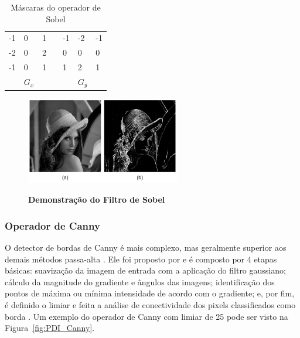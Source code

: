 \documentclass[12pt,oneside,a4paper,english,french,spanish,brazil,]{abntex2}
\begin{document}
\begin{table}[]
\centering
\caption{Máscaras do operador de Sobel}
\label{tab:Sobel}
\begin{tabular}{lllllll}
\cline{1-3} \cline{5-7}
\multicolumn{1}{|l|}{-1} & \multicolumn{1}{l|}{0} & \multicolumn{1}{l|}{1} & \multicolumn{1}{l|}{} & \multicolumn{1}{l|}{-1} & \multicolumn{1}{l|}{-2} & \multicolumn{1}{l|}{-1} \\ \cline{1-3} \cline{5-7} 
\multicolumn{1}{|l|}{-2} & \multicolumn{1}{l|}{0} & \multicolumn{1}{l|}{2} & \multicolumn{1}{l|}{} & \multicolumn{1}{l|}{0}  & \multicolumn{1}{l|}{0}  & \multicolumn{1}{l|}{0}  \\ \cline{1-3} \cline{5-7} 
\multicolumn{1}{|l|}{-1} & \multicolumn{1}{l|}{0} & \multicolumn{1}{l|}{1} & \multicolumn{1}{l|}{} & \multicolumn{1}{l|}{1}  & \multicolumn{1}{l|}{2}  & \multicolumn{1}{l|}{1}  \\ \cline{1-3} \cline{5-7} 
                         & \(G_x\)                   &                        &                       &                         & \(G_y\)                    &                        
\end{tabular}
\end{table}

\begin{figure}[ht]
\centering
\caption{\textbf{Demonstração do Filtro de Sobel}}
\includegraphics[width=0.6\textwidth]{imagens/PDI_Sobel.pdf}
\sourceAuthor
\label{fig:PDI_Sobel}
\end{figure}

\subsubsection{Operador de Canny}

O detector de bordas de Canny é mais complexo, mas geralmente superior aos demais métodos passa-alta \cite{gonzalez:2012}. Ele foi proposto por \citet{canny:1987} e é composto por 4 etapas básicas: suavização da imagem de entrada com a aplicação do filtro gaussiano; cálculo da magnitude do gradiente e ângulos das imagens; identificação dos pontos de máxima ou mínima intensidade de acordo com o gradiente; e, por fim, é definido o limiar e feita a análise de conectividade dos pixels classificados como borda \cite{gonzalez:2012}. Um exemplo do operador de Canny com limiar de 25 pode ser visto na Figura~\ref{fig:PDI_Canny}.
\end{document}
